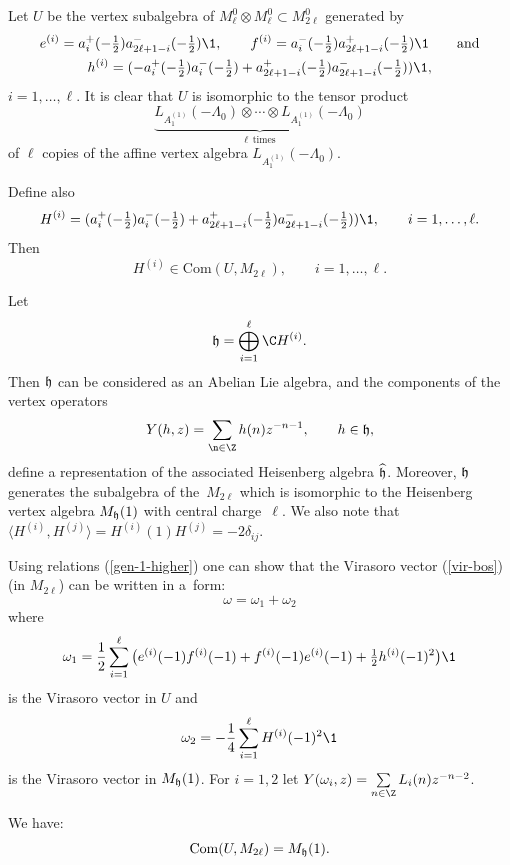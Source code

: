 \documentclass[pdftex]{sigma}
\begin{document}
Let $U$ be the vertex subalgebra  of $M_{\ell} ^0 \otimes M_{\ell}
^0 \subset M_{2 \ell} ^0$ generated by
\begin{gather}
e^{(i)}=a_i ^+ (-\tfrac{1}{2}) a_{
2\ell +1-i} ^-( -\tfrac{1}{2}) {\1}, \qquad  f^{(i)}=a_ i ^-
(-\tfrac{1}{2}) a_{2\ell +1-i} ^+(
-\tfrac{1}{2}) {\1} \qquad \mbox{and} \nonumber \\
 h^{(i)}= (-a_ i ^+ (-\tfrac{1}{2}) a_i^-( -\tfrac{1}{2}) +
a_{2\ell +1-i} ^+ (-\tfrac{1}{2}) a_{2\ell +1-i} ^-( -\tfrac{1}{2})){\1}, \label{gen-1-higher}
 \end{gather}
$i =1, \dots, \ell$. It is clear that $U$ is isomorphic to the tensor product
\[
 \underbrace{ L_{A_1 ^{(1)}}( -\Lambda _{0}) \otimes \cdots \otimes  L_{A_1 ^{(1)}}( -\Lambda _{0})}_{\ell \ \  \mbox{times} }
\]
of $\ell$ copies of the af\/f\/ine vertex algebra $ L_{A_1 ^{(1)}}(-\Lambda _{0})$.

Def\/ine also
 \[
 H ^{(i)} =   (a_i ^+ (-\tfrac{1}{2}) a_i ^- (-\tfrac{1}{2})+a_{2\ell +1-i} ^+ (-\tfrac{1}{2})
 a_{2\ell +1-i} ^- (-\tfrac{1}{2}) ) {\1}, \qquad i=1, \dots,
 \ell.
 \]
 Then
 \[ H ^{(i)} \in \mbox{Com} ( U, M_{2\ell}), \qquad i=1, \dots,  \ell.
 \]

 Let \[ {\frak h}= \bigoplus_{i =1 } ^{ \ell} {\C} H ^{(i)}.\] Then ${\frak h}$ can be
 considered as an Abelian Lie algebra, and the components of the vertex operators
 \[
 Y(h,z) = \sum_{\n \in {\Z} } h(n) z ^{-n-1}, \qquad h \in {\frak  h},
 \]
 def\/ine a representation of the associated Heisenberg algebra $\widehat{\frak h}$.
 Moreover, ${\frak h}$ generates the subalgebra of the~$M_{2 \ell}$ which is isomorphic to the
 Heisenberg vertex algebra $M_{\frak h} (1)$ with central charge~$\ell$.
 We also note that $\langle H ^{(i)}, H ^{(j)} \rangle = H ^{(i)}(1)H ^{(j)}= -2 \delta _{ij}$.


Using relations (\ref{gen-1-higher}) one can show that the Virasoro
vector (\ref{vir-bos}) (in $M_{2 \ell}$) can be written in a~form:
\[ \omega =  \omega_1   + \omega_2 \]
where \[\omega_1 =\frac{1}{2} \sum_{i = 1 } ^{\ell} \big(e
^{(i)}(-1)f^{(i)}(-1)+f ^{(i)} (-1)e^{(i)}(-1)+ \tfrac{1}{2} h ^{(i)}
(-1)^2\big){\1}
\] is the  Virasoro vector  in $U$  and
\[\omega_2 = -\frac{1}{4}\sum_{i = 1 } ^{\ell} H ^{(i) }(-1) ^{2}
{\1}\] is the Virasoro vector   in $M_{\frak h} (1)$.
For $i=1,2$ let
$Y(\omega_i , z) = \sum\limits_{n\in {\Z} } L_i (n) z ^{-n-2}$.

\begin{proposition} \label{com-bos-higher}
We have:
\[
{\rm Com} (U, M_{2\ell}) = M_{\frak h} (1).
\]
\end{proposition}
\end{document}
